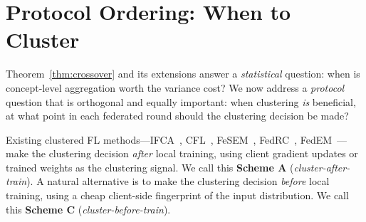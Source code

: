 
\section{Protocol Ordering: When to Cluster}
\label{sec:protocol}

Theorem~\ref{thm:crossover} and its extensions answer a \emph{statistical} question: when is concept-level aggregation worth the variance cost? We now address a \emph{protocol} question that is orthogonal and equally important: when clustering \emph{is} beneficial, at what point in each federated round should the clustering decision be made?

Existing clustered FL methods---IFCA~\citep{ghosh2020efficient}, CFL~\citep{sattler2021clustered}, FeSEM~\citep{long2023multi}, FedRC~\citep{guo2024fedrc}, FedEM~\citep{marfoq2021federated}---make the clustering decision \emph{after} local training, using client gradient updates or trained weights as the clustering signal. We call this \textbf{Scheme A} (\textit{cluster-after-train}). A natural alternative is to make the clustering decision \emph{before} local training, using a cheap client-side fingerprint of the input distribution. We call this \textbf{Scheme C} (\textit{cluster-before-train}).

